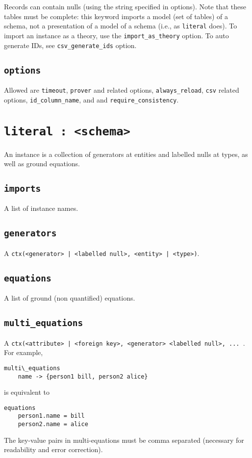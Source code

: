 \documentclass[10pt]{book}
\begin{document}
Records can contain nulls (using the string specified in options).  Note that these tables must be complete: this keyword imports a model (set of tables) of a schema, not a presentation of a model of a schema (i.e., as {\tt literal} does).  To import an instance as a theory, use the {\tt import\_as\_theory} option.  To auto generate IDs, see {\tt csv\_generate\_ids} option.

\subsection{{\tt options}}
Allowed are {\tt timeout}, {\tt prover} and related options, {\tt always\_reload}, {\tt csv} related options, {\tt id\_column\_name}, and and {\tt require\_consistency}. 


\section{{\tt literal : <schema>}}

An instance is a collection of generators at entities and labelled nulls at types, as well as ground equations.

\subsection{{\tt imports}}
A list of instance names.

\subsection{{\tt generators}}
A {\tt ctx(<generator> | <labelled null>, <entity> | <type>)}.

\subsection{{\tt equations}}
A list of ground (non quantified) equations.

\subsection{{\tt multi\_equations}}
A {\tt ctx(<attribute> | <foreign key>, {<generator> <labelled null>, ... }}.  For example,
\begin{verbatim}
multi\_equations
	name -> {person1 bill, person2 alice}
\end{verbatim}
is equivalent to
\begin{verbatim}
equations
	person1.name = bill
	person2.name = alice
\end{verbatim}
The key-value pairs in multi-equations must be comma separated (necessary for readability and error correction).
\end{document}

